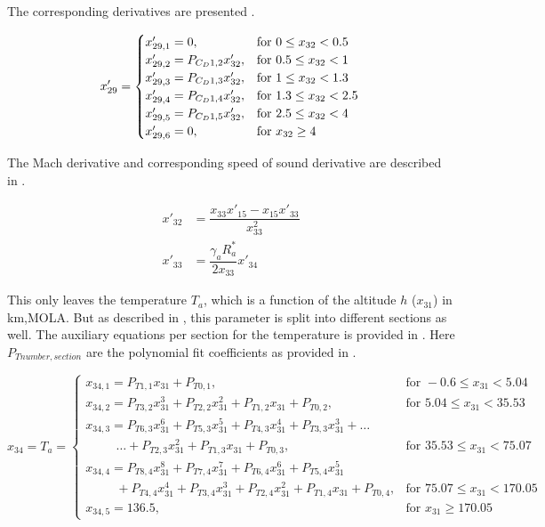 The corresponding derivatives are presented .

\begin{equation}\label{eq:cdCondDer}
x'_{29}=\begin{cases}
x'_{29,1}=0, & \text{for } 0\leq x_{32} < 0.5\\
x'_{29,2}=P_{C_{D} 1,2}x'_{32}, &  \text{for } 0.5\leq x_{32} < 1 \\
x'_{29,3}=P_{C_{D} 1,3}x'_{32}, &  \text{for } 1\leq x_{32} < 1.3 \\
x'_{29,4}=P_{C_{D} 1,4}x'_{32}, &  \text{for } 1.3\leq x_{32} < 2.5 \\
x'_{29,5}=P_{C_{D} 1,5}x'_{32}, &  \text{for } 2.5\leq x_{32} < 4 \\
x'_{29,6}=0, &  \text{for } x_{32} \geq 4 
\end{cases}\\
\end{equation}

The Mach derivative and corresponding speed of sound derivative are described in .

 \begin{equation} \label{eq:cdDerAux}
\begin{split}
x'_{32} &= \dfrac{x_{33}x'_{15}-x_{15}x'_{33}}{x_{33}^{2}}\\
x'_{33} &= \dfrac{\gamma_{a}R_{a}^{*}}{2x_{33}}x'_{34} 
\end{split}
\end{equation}

This only leaves the temperature $T_{a}$, which is a function of the altitude $h$ ($x_{31}$) in km,\ac{MOLA}. But as described in , this parameter is split into different sections as well. The auxiliary equations per section for the temperature is provided in . Here $P_{T number,section}$ are the polynomial fit coefficients as provided in .

\begin{equation}\label{eq:tempCondAux}
x_{34}=T_{a}=\begin{cases}
x_{34,1}=P_{T 1,1}x_{31}+P_{T 0,1}, & \text{for } -0.6 \leq x_{31} < 5.04  \\
x_{34,2}=P_{T 3,2}x_{31}^{3}+P_{T 2,2}x_{31}^{2}+P_{T 1,2}x_{31}+P_{T 0,2}, &  \text{for } 5.04 \leq x_{31} < 35.53   \\
x_{34,3}=P_{T 6,3}x_{31}^{6}+P_{T 5,3}x_{31}^{5}+P_{T 4,3}x_{31}^{4}+P_{T 3,3}x_{31}^{3}+ \dots \\
\qquad\ \ \dotsc +P_{T 2,3}x_{31}^{2}+P_{T 1,3}x_{31}+P_{T 0,3}, &  \text{for } 35.53 \leq x_{31} < 75.07   \\
x_{34,4}=P_{T 8,4}x_{31}^{8}+P_{T 7,4}x_{31}^{7}+P_{T 6,4}x_{31}^{6}+P_{T 5,4}x_{31}^{5} \\
\qquad\ \ +P_{T 4,4}x_{31}^{4}+P_{T 3,4}x_{31}^{3}+P_{T 2,4}x_{31}^{2}+P_{T 1,4}x_{31}+P_{T 0,4}, &  \text{for } 75.07 \leq x_{31} < 170.05   \\
x_{34,5}=136.5, &  \text{for }  x_{31} \geq 170.05   
\end{cases}
\end{equation}

